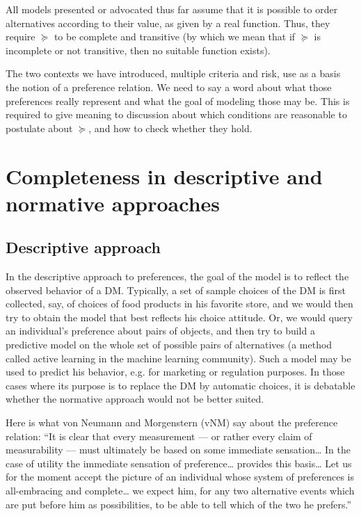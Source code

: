 \documentclass[french, english]{llncs}
\begin{document}
	All models presented or advocated thus far assume that it is possible to order alternatives according to their value, as given by a real function. Thus, they require $\succeq$ to be complete and transitive (by which we mean that if $\succeq$ is incomplete or not transitive, then no suitable function exists).
	
	The two contexts we have introduced, multiple criteria and risk, use as a basis the notion of a preference relation. We need to say a word about what those preferences really represent and what the goal of modeling those may be. This is required to give meaning to discussion about which conditions are reasonable to postulate about $\succeq$, and how to check whether they hold.
	
	\section{Completeness in descriptive and normative approaches}
	
	
	
	\subsection{Descriptive approach}
	In the descriptive approach to preferences, the goal of the model is to reflect the observed behavior of a \ac{DM}. Typically, a set of sample choices of the \ac{DM} is first collected, say, of choices of food products in his favorite store, and we would then try to obtain the model that best reflects his choice attitude. Or, we would query an individual’s preference about pairs of objects, and then try to build a predictive model on the whole set of possible pairs of alternatives (a method called active learning in the machine learning community). Such a model may be used to predict his behavior, e.g. for marketing or regulation purposes. In those cases where its purpose is to replace the \ac{DM} by automatic choices, it is debatable whether the normative approach would not be better suited.
	
	Here is what von Neumann and Morgenstern (vNM) say about the preference relation:
	“It is clear that every measurement --- or rather every claim of measurability --- must ultimately be based on some immediate sensation\ldots
	In the case of utility the immediate sensation of preference\ldots%
	provides this basis\ldots %
	Let us for the moment accept the picture of an individual whose system of preferences is all-embracing and complete\ldots%
	 we expect him, for any two alternative events which are put before him as possibilities, to be able to tell which of the two he prefers.” %
	
\end{document}
